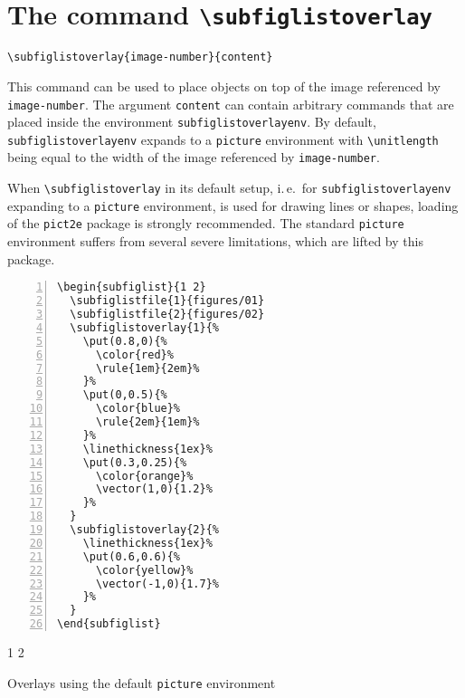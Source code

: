 \documentclass[version=3.12,american]{scrartcl}
\begin{document}
\section{The command \texttt{\textbackslash subfiglistoverlay}}

\begin{verbatim}
\subfiglistoverlay{image-number}{content}
\end{verbatim}

This command can be used to place objects on top of the image referenced by \texttt{image-number}. The argument \texttt{content} can contain arbitrary commands that are placed inside the environment \texttt{subfiglistoverlayenv}. By default, \texttt{subfiglistoverlayenv} expands to a \texttt{picture} environment with \verb|\unitlength| being equal to the width of the image referenced by \texttt{image-number}.

When \verb|\subfiglistoverlay| in its default setup, i.\,e.\ for \texttt{subfiglistoverlayenv} expanding to a \texttt{picture} environment, is used for drawing lines or shapes, loading of the \texttt{pict2e} package is strongly recommended. The standard \texttt{picture} environment suffers from several severe limitations, which are lifted by this package.

\begin{listing}
\begin{minipage}{0.4\textwidth}
\begin{Verbatim}[numbers=left]
\begin{subfiglist}{1 2}
  \subfiglistfile{1}{figures/01}
  \subfiglistfile{2}{figures/02}
  \subfiglistoverlay{1}{%
    \put(0.8,0){%
      \color{red}%
      \rule{1em}{2em}%
    }%
    \put(0,0.5){%
      \color{blue}%
      \rule{2em}{1em}%
    }%
    \linethickness{1ex}%
    \put(0.3,0.25){%
      \color{orange}%
      \vector(1,0){1.2}%
    }%
  }
  \subfiglistoverlay{2}{%
    \linethickness{1ex}%
    \put(0.6,0.6){%
      \color{yellow}%
      \vector(-1,0){1.7}%
    }%
  }
\end{subfiglist}
\end{Verbatim}
\end{minipage}
\hfill
\begin{minipage}{0.5\textwidth}
\begin{subfiglist}{1 2}
\end{subfiglist}
\end{minipage}
\caption{Overlays using the default \texttt{picture} environment}
\label{lst:overlay-picture}
\end{listing}
\end{document}
